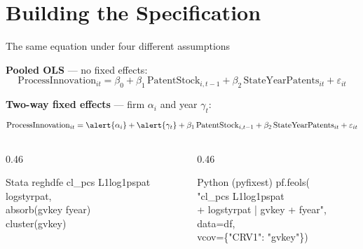 \documentclass[aspectratio=169, 11pt]{beamer}
\begin{document}
\section{Building the Specification}

\begin{frame}{The same equation under four different assumptions}

\vspace{0.3cm}

\textbf{Pooled OLS} --- no fixed effects:
\[
  \text{ProcessInnovation}_{it} = \beta_0 + \beta_1 \, \text{PatentStock}_{i,t-1}
  + \beta_2 \, \text{StateYearPatents}_{it} + \varepsilon_{it}
\]

\vspace{0.3cm}

\textbf{Two-way fixed effects} --- firm $\alpha_i$ and year $\gamma_t$:
\[
  \text{ProcessInnovation}_{it} = \alert{\alpha_i} + \alert{\gamma_t}
  + \beta_1 \, \text{PatentStock}_{i,t-1}
  + \beta_2 \, \text{StateYearPatents}_{it} + \varepsilon_{it}
\]

\vspace{0.4cm}

\begin{columns}[T]
\begin{column}{0.46\textwidth}
\begin{block}{Stata}
\vspace{0.2em}
{\ttfamily\scriptsize\color{TextGrey}%
reghdfe cl\_pcs L1log1pspat\\
\hspace*{1em}logstyrpat,\\
\hspace*{1em}absorb(gvkey fyear)\\
\hspace*{1em}cluster(gvkey)}
\vspace{0.2em}
\end{block}
\end{column}
\begin{column}{0.46\textwidth}
\begin{block}{Python (pyfixest)}
\vspace{0.2em}
{\ttfamily\scriptsize\color{TextGrey}%
pf.feols(\\
\hspace*{1em}"cl\_pcs \texttildelow{} L1log1pspat\\
\hspace*{2em}+ logstyrpat | gvkey + fyear",\\
\hspace*{1em}data=df,\\
\hspace*{1em}vcov=\{"CRV1": "gvkey"\})}
\vspace{0.2em}
\end{block}
\end{column}
\end{columns}


\end{frame}
\end{document}
